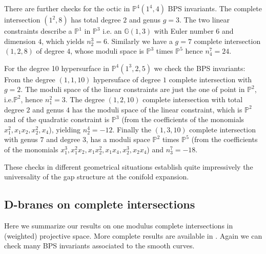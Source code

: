 \documentclass[12pt]{article}
\begin{document}
There are further checks for the octic in $\mathbb{P}^4(1^4,4)$ BPS
invariants. The complete intersection $(1^2,8)$
has total degree $2$ and genus $g=3$. The two linear constraints
describe a $\mathbb{P}^1$ in $\mathbb{P}^3$ i.e. an
$\mathbb{G}(1,3)$ with Euler number $6$ and dimension $4$, which
yields $n^3_2=6$. Similarly we have a $g=7$ complete intersection
$(1,2,8)$ of degree $4$, whose moduli space is  $\mathbb{P}^3$
times $\mathbb{P}^5$ hence $n^7_4=24$.

For the degree 10 hypersurface in $\mathbb{P}^4(1^3,2,5)$ we check the BPS invariants:
{}From the degree $(1,1,10)$ hypersuface of degree $1$ complete intersection with $g=2$. The moduli
space of the linear constraints are just the one of  point in
$\mathbb{P}^2$, i.e.$\mathbb{P}^2$, hence $n^2_1=3$. The degree
$(1,2,10)$ complete intersection with total degree $2$ and genus
$4$ has the moduli space of the linear constraint, which is
$\mathbb{P}^2$ and of the quadratic constraint is $\mathbb{P}^3$
(from the coefficients of the monomials $x_1^2,x_1 x_2,
x^2_2,x_4$), yielding $n_2^4=- 12$. Finally  the $(1,3,10)$
complete intersection with genus $7$ and degree $3$, has a moduli
space $\mathbb{P}^2$ times $\mathbb{P}^5$ (from the coefficients
of the monomials $x_1^3,x_1^2 x_2, x_1 x^2_2,x_1 x_4,x_2^3 ,x_2
x_4$) and $n_3^7=- 18$.

These checks in different geometrical situations
establish quite impressively the universality
of the gap structure at the conifold expansion.



\subsection{D-branes on complete intersections}
Here we summarize our results on one modulus complete
intersections in (weighted) projective space. More complete
results are available in \cite{webpage}. Again we can check many
BPS invariants associated to the smooth curves.
\end{document}
